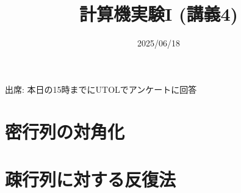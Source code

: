 \documentclass[10pt,dvipdfmx]{beamer}
\title{計算機実験I (講義4)}
\date{2025/06/18}
\begin{document}
\begin{frame}
  \titlepage
  \tableofcontents
  出席: 本日の15時までにUTOLでアンケートに回答
\end{frame}

\section{密行列の対角化}


%

%











%


\section{疎行列に対する反復法}

%











% 
% 





\section{}

\end{document}
